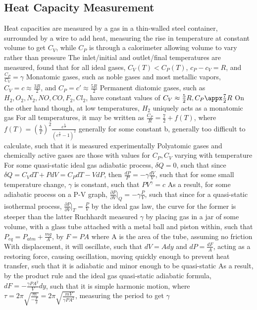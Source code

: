 \documentclass[11 pt, twoside]{article}
\newenvironment{outline*}
{
	\begin{outline}[enumerate]
	}
	{\end{outline}
}
\begin{document}
\subsection{Heat Capacity Measurement}
\begin{outline*}
\1 Heat capacities are measured by a gas in a thin-walled steel container, surrounded by a wire to add heat, measuring the rise in temperature at constant volume to get $C_V$, while $C_P$ is through a calorimeter allowing volume to vary rather than pressure
\2 The inlet/initial and outlet/final temperatures are measured, found that for all ideal gases, $C_V(T) < C_P(T)$, $c_P - c_V = R$, and $\frac{C_P}{C_V} = \gamma$
\2 Monatomic gases, such as noble gases and most metallic vapors, $C_V = c \approx \frac{3R}{2}$, and $C_P = c' \approx \frac{5R}{2}$
\2 Permanent diatomic gases, such as $H_2, O_2, N_2, NO, CO, F_2, Cl_2$, have constant values of $C_V \approx \frac{5}{2}R, C_P \appx  \frac{7}{2}R$
\3 On the other hand though, at low temperatures, $H_2$ uniquely acts as a monatomic gas
\3 For all temperatures, it may be written as $\frac{C_P}{R} = \frac{7}{2} + f(T)$, where $f(T) = (\frac{b}{T})^2 \frac{e^{\frac{b}{T}}}{(e^{\frac{b}{T}} - 1)^2}$ generally for some constant b, generally too difficult to calculate, such that it is measured experimentally
\2 Polyatomic gases and chemically active gases are those with values for $C_P, C_V$ varying with temperature
\1 For some quasi-static ideal gas adiabatic process, $\delta Q = 0$, such that since $\delta Q = C_VdT + PdV = C_PdT - VdP$, then $\frac{dP}{P} = -\gamma \frac{dV}{V}$, such that for some small temperature change, $\gamma$ is constant, such that $PV^\gamma = c$
\2 As a result, for some adiabatic process on a P-V graph, $\frac{\partial P}{\partial V}|_Q = -\gamma \frac{P}{V}$, such that since for a quasi-static isothermal process, $\frac{\partial P}{\partial V}|_T = \frac{P}{V}$ by the ideal gas law, the curve for the former is steeper than the latter
\1 Ruchhardt measured $\gamma$ by placing gas in a jar of some volume, with a glass tube attached with a metal ball and piston within, such that $P_{eq} = P_{atm} + \frac{mg}{A}$, by $F = PA$  where A is the area of the tube, assuming no friction
\2 With displacement, it will oscillate, such that $dV = Ady$ and $dP = \frac{dF}{A}$, acting as a restoring force, causing oscillation, moving quickly enough to prevent heat transfer, such that it is adiabatic and minor enough to be quasi-static
\2 As a result, by the product rule and the ideal gas quasi-static adiabatic formula, $dF = -\frac{\gamma PA^2}{V}dy$, such that it is simple harmonic motion, where $\tau = 2\pi \sqrt{\frac{m}{-\frac{F}{y}}} = 2\pi \sqrt{\frac{mV}{\gamma PA^2}}$, measuring the period to get $\gamma$

\end{outline*}
\end{document}
